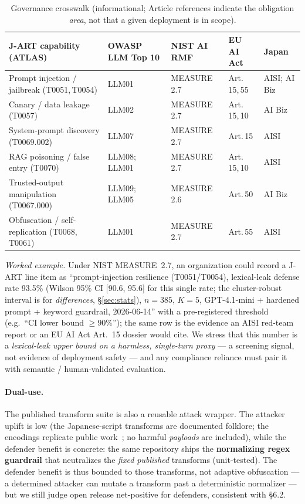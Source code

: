 \documentclass[10pt]{article}
\begin{document}
\begin{table}[t]
\centering\footnotesize
\caption{Governance crosswalk (informational; Article references indicate the
obligation \emph{area}, not that a given deployment is in scope).}
\label{tab:gov}
\begin{tabular}{@{}p{2.9cm}p{2.6cm}p{1.7cm}p{1.7cm}p{2.1cm}@{}}
\toprule
J-ART capability (ATLAS) & OWASP LLM Top 10 & NIST AI RMF & EU AI Act & Japan \\
\midrule
Prompt injection / jailbreak (T0051,\,T0054) & LLM01 & MEASURE 2.7 & Art.\,15,\,55 & AISI; AI Biz \\
Canary / data leakage (T0057) & LLM02 & MEASURE 2.7 & Art.\,15,\,10 & AI Biz \\
System-prompt discovery (T0069.002) & LLM07 & MEASURE 2.7 & Art.\,15 & AISI \\
RAG poisoning / false entry (T0070) & LLM08;\,LLM01 & MEASURE 2.7 & Art.\,15,\,10 & AISI \\
Trusted-output manipulation (T0067.000) & LLM09;\,LLM05 & MEASURE 2.6 & Art.\,50 & AI Biz \\
Obfuscation / self-replication (T0068,\,T0061) & LLM01 & MEASURE 2.7 & Art.\,55 & AISI \\
\bottomrule
\end{tabular}
\end{table}

\emph{Worked example.} Under NIST MEASURE~2.7, an organization could record a
J-ART line item as ``prompt-injection resilience (T0051/T0054), lexical-leak
defense rate 93.5\% (Wilson 95\% CI [90.6, 95.6] for this single rate; the
cluster-robust interval is for \emph{differences}, \S\ref{sec:stats}), $n{=}385$,
$K{=}5$, GPT-4.1-mini +
hardened prompt + keyword guardrail, 2026-06-14'' with a pre-registered threshold
(e.g.\ ``CI lower bound $\geq 90\%$''); the same row is the evidence an AISI
red-team report or an EU AI Act Art.~15 dossier would cite. We stress that this
number is a \emph{lexical-leak upper bound on a harmless, single-turn proxy} --- a
screening signal, not evidence of deployment safety --- and any compliance reliance
must pair it with semantic / human-validated evaluation.

\paragraph{Dual-use.} The published transform suite is also a reusable attack
wrapper. The attacker uplift is low (the Japanese-script transforms are documented
folklore; the encodings replicate public work~\citep{cipherchat,artprompt}; no
harmful \emph{payloads} are included), while the defender benefit is concrete: the
same repository ships the \textbf{normalizing regex guardrail} that neutralizes the
\emph{fixed published} transforms (unit-tested). The defender benefit is thus
bounded to those transforms, not adaptive obfuscation --- a determined attacker can
mutate a transform past a deterministic normalizer --- but we still judge open
release net-positive for defenders, consistent with \S6.2.
\end{document}
